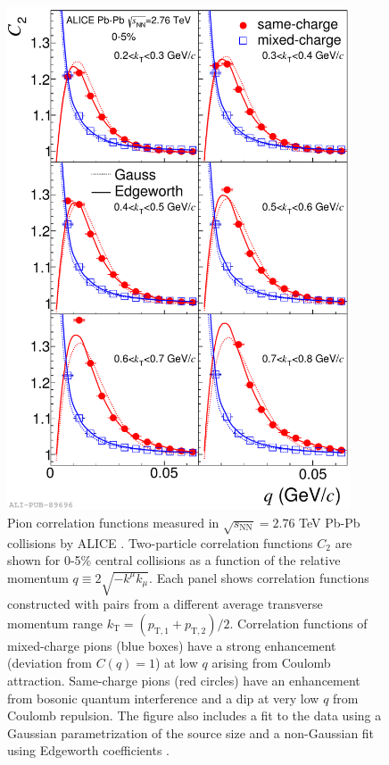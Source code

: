 \begin{figure}[hbtp]
\includegraphics[width=24pc]{Figures/BorrowedFigures/PionCorrelationFunctions.pdf}
\caption[Femtoscopy of same-charge and mixed-charge pions]{
Pion correlation functions measured in $\sqrt{s_\mathrm{NN}} = 2.76$ TeV Pb-Pb collisions by ALICE \cite{Abelev:2013pqa}.
Two-particle correlation functions $C_2$ are shown for 0-5\% central collisions as a function of the relative momentum $q \equiv 2 \sqrt{-k^\mu k_\mu}$.
Each panel shows correlation functions constructed with pairs from a different average transverse momentum range $k_\mathrm{T} = (p_\mathrm{T,1} + p_\mathrm{T,2})/2$. 
Correlation functions of mixed-charge pions (blue boxes) have a strong enhancement (deviation from $C(q) = 1$) at low $q$ arising from Coulomb attraction.
Same-charge pions (red circles) have an enhancement from bosonic quantum interference and a dip at very low $q$ from Coulomb repulsion.
The figure also includes a fit to the data using a Gaussian parametrization of the source size and a non-Gaussian fit using Edgeworth coefficients \cite{Blinnikov:1997jq}.}
\label{fig:PionCorrelationFunctions}
\end{figure}

